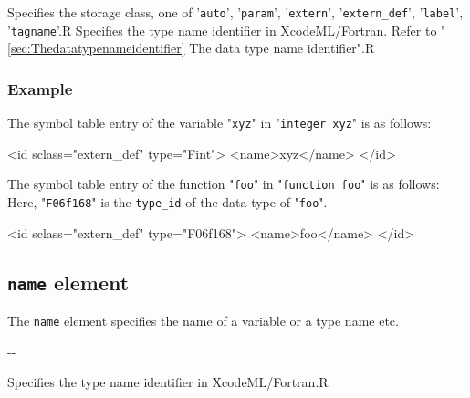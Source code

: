 \begin{XcodeMLAttributes}
{Specifies the storage class, one of '{\tt auto}', '{\tt param}', '{\tt extern}', '{\tt extern\_def}', '{\tt label}', '{\tt tagname}'.}{R}
{Specifies the type name identifier in XcodeML/Fortran.
 Refer to "\ref{sec:Thedatatypenameidentifier} The data type name identifier".}{R}
\end{XcodeMLAttributes}

\subsubsection*{Example}

The symbol table entry of the variable "{\tt xyz}" in "{\tt integer xyz}" is as follows:
\vspace{2mm}

\begin{XcodeMLFExample}
<id sclass="extern_def" type="Fint">
  <name>xyz</name>
</id>
\end{XcodeMLFExample}

The symbol table entry of the function "{\tt foo}" in "{\tt function foo}" is as follows:
Here, "{\tt F06f168}" is the {\tt type\_id} of the data type of "{\tt foo}".
\vspace{2mm}

\begin{XcodeMLFExample}
<id sclass="extern_def" type="F06f168">
  <name>foo</name>
</id>
\end{XcodeMLFExample}


\subsection{ {\tt name} element}

The {\tt name} element specifies the name of a variable or a type name etc.


\begin{XcodeMLChildElements}
\XcodeMLElementDef{-}
{-}{-}
\end{XcodeMLChildElements}

\begin{XcodeMLAttributes}
{Specifies the type name identifier in XcodeML/Fortran.}{R}
\end{XcodeMLAttributes}


